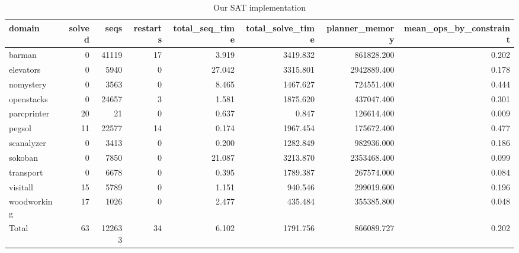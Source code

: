 \begin{table*}[ht]
\centering
\begin{tabular}{lrrrrrrr}
  \hline
domain & solved & seqs & restarts & total\_seq\_time & total\_solve\_time & planner\_memory & mean\_ops\_by\_constraint \\ 
  \hline
barman &    0 & 41119 &   17 & 3.919 & 3419.832 & 861828.200 & 0.202 \\ 
  elevators &    0 & 5940 &    0 & 27.042 & 3315.801 & 2942889.400 & 0.178 \\ 
  nomystery &    0 & 3563 &    0 & 8.465 & 1467.627 & 724551.400 & 0.444 \\ 
  openstacks &    0 & 24657 &    3 & 1.581 & 1875.620 & 437047.400 & 0.301 \\ 
  parcprinter &   20 &   21 &    0 & 0.637 & 0.847 & 126614.400 & 0.009 \\ 
  pegsol &   11 & 22577 &   14 & 0.174 & 1967.454 & 175672.400 & 0.477 \\ 
  scanalyzer &    0 & 3413 &    0 & 0.200 & 1282.849 & 982936.000 & 0.186 \\ 
  sokoban &    0 & 7850 &    0 & 21.087 & 3213.870 & 2353468.400 & 0.099 \\ 
  transport &    0 & 6678 &    0 & 0.395 & 1789.387 & 267574.000 & 0.084 \\ 
  visitall &   15 & 5789 &    0 & 1.151 & 940.546 & 299019.600 & 0.196 \\ 
  woodworking &   17 & 1026 &    0 & 2.477 & 435.484 & 355385.800 & 0.048 \\ 
  Total &   63 & 122633 &   34 & 6.102 & 1791.756 & 866089.727 & 0.202 \\ 
   \hline
\end{tabular}
\caption{Our SAT implementation} 
\label{tab:sat}
\end{table*}
